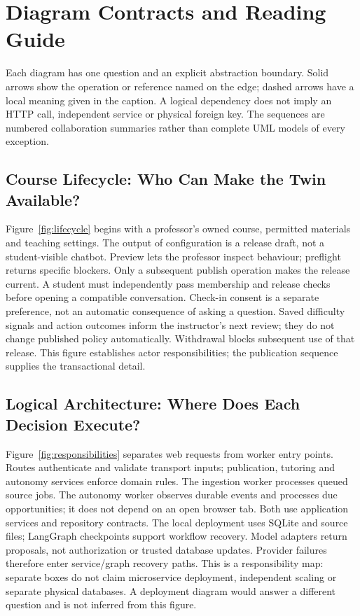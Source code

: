 \clearpage
\section{Diagram Contracts and Reading Guide}
\label{sec:diagram-contracts}
Each diagram has one question and an explicit abstraction boundary. Solid arrows
show the operation or reference named on the edge; dashed arrows have a local
meaning given in the caption. A logical dependency does not imply an HTTP call,
independent service or physical foreign key. The sequences are numbered
collaboration summaries rather than complete UML models of every exception.

\subsection{Course Lifecycle: Who Can Make the Twin Available?}
Figure~\ref{fig:lifecycle} begins with a professor's owned course, permitted
materials and teaching settings. The output of configuration is a release draft,
not a student-visible chatbot. Preview lets the professor inspect behaviour;
preflight returns specific blockers. Only a subsequent publish operation makes
the release current. A student must independently pass membership and release
checks before opening a compatible conversation. Check-in consent is a separate
preference, not an automatic consequence of asking a question. Saved difficulty
signals and action outcomes inform the instructor's next review; they do not
change published policy automatically. Withdrawal blocks subsequent use of that
release. This figure establishes actor responsibilities; the publication
sequence supplies the transactional detail.

\subsection{Logical Architecture: Where Does Each Decision Execute?}
Figure~\ref{fig:responsibilities} separates web requests from worker entry points.
Routes authenticate and validate transport inputs; publication, tutoring and
autonomy services enforce domain rules. The ingestion worker processes queued
source jobs. The autonomy worker observes durable events and processes due
opportunities; it does not depend on an open browser tab. Both use application
services and repository contracts. The local deployment uses SQLite and source
files; LangGraph checkpoints support workflow recovery. Model adapters return
proposals, not authorization or trusted database updates. Provider failures
therefore enter service/graph recovery paths. This is a responsibility map:
separate boxes do not claim microservice deployment, independent scaling or
separate physical databases. A deployment diagram would answer a different
question and is not inferred from this figure.

